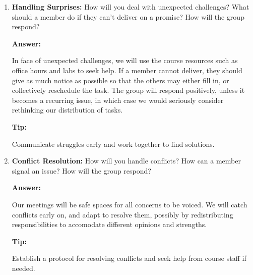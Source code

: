 \documentclass[12pt]{article}
\newenvironment{answer}[1][]{
  \color{blue}\textbf{Answer:}
}{}
\newenvironment{alice}[1][]{
  \color{black}\textbf{Tip:}
}{}
\begin{document}
\begin{enumerate}
\begin{alice}

Communicate struggles early and work together to find solutions.
\end{alice}

\item {\bf Handling Surprises:} How will you deal with unexpected challenges? What should a member do if they can’t deliver on a promise? How will the group respond?

\begin{answer}
  In face of unexpected challenges, we will use the course resources such as office hours and labs to seek help. If a member cannot deliver, they should give as much notice as possible so that the others may either fill in, or collectively reschedule the task. The group will respond positively, unless it becomes a recurring issue, in which case we would seriously consider rethinking our distribution of tasks.
\end{answer}

\begin{alice}

Communicate struggles early and work together to find solutions.
\end{alice}

\item {\bf Conflict Resolution:} How will you handle conflicts? How can a member signal an issue? How will the group respond?

\begin{answer}
  Our meetings will be safe spaces for all concerns to be voiced. We will catch conflicts early on, and adapt to resolve them, possibly by redistributing responsibilities to accomodate different opinions and strengths.
\end{answer}

\begin{alice}

Establish a protocol for resolving conflicts and seek help from course staff if needed.
\end{alice}

\end{enumerate}
\end{document}
